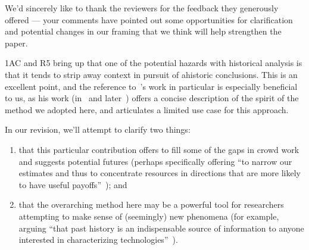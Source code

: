 \documentclass[11pt]{article}
\begin{document}
We'd sincerely like to thank the reviewers for the feedback they generously offered
--- your comments have pointed out some opportunities for clarification
and potential changes in our framing that we think will help strengthen the paper.

1AC and R5 bring up that one of the potential hazards with
historical analysis is that
it tends to strip away context in pursuit of ahistoric conclusions.
This is an excellent point, and
the reference to~\citeauthor{rosenberg1994exploring}'s
work in particular is especially beneficial to us, as his work
(in~\citeyear{rosenberg1982inside} and later~\citeyear{rosenberg1994exploring})
offers a concise description of the spirit of the method we adopted here,
and articulates a limited use case for this approach.

In our revision, we'll attempt to clarify two things:
\begin{enumerate}
  \item that this particular contribution offers
        to fill some of the gaps in crowd work and suggests potential futures
        (perhaps specifically offering
            ``to narrow our estimates
              and thus to concentrate resources
              in directions that are more likely to have useful payoffs''~\cite{rosenberg1994exploring});
  and
  \item that the overarching method here may be
        a powerful tool for researchers attempting
        to make sense of (seemingly) new phenomena
        (for example,
        arguing ``that past history is
                  an indispensable source of information
                  to anyone interested in characterizing technologies''~\cite{rosenberg1982inside}).
\end{enumerate}



\end{document}
